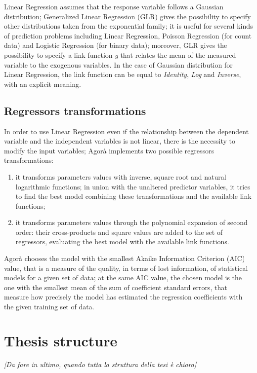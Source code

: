 Linear Regression assumes that the response variable follows a Gaussian distribution; Generalized Linear Regression (GLR) gives the possibility to specify other distributions taken from the exponential family; it is useful for several kinds of prediction problems including Linear Regression, Poisson Regression (for count data) and Logistic Regression (for binary data); moreover, GLR gives the possibility to specify a link function \textit{g} that relates the mean of the measured variable to the exogenous variables. In the case of Gaussian distribution for Linear Regression, the link function can be equal to \textit{Identity}, \textit{Log} and \textit{Inverse}, with an explicit meaning.


\subsection{Regressors transformations}\label{regrTransforms}

In order to use Linear Regression even if the relationship between the dependent variable and the independent variables is not linear, there is the necessity to modify the input variables; Agorà implements two possible regressors transformations:

\begin{enumerate}

    \item it transforms parameters values with inverse, square root and natural logarithmic functions; in union with the unaltered predictor variables, it tries to find the best model combining these transformations and the available link functions;
    
    \item it transforms parameters values through the polynomial expansion of second order: their cross-products and square values are added to the set of regressors, evaluating the best model with the available link functions.

\end{enumerate}

Agorà chooses the model with the smallest Akaike Information Criterion (AIC) value, that is a measure of the quality, in terms of lost information, of statistical models for a given set of data; at the same AIC value, the chosen model is the one with the smallest mean of the sum of coefficient standard errors, that measure how precisely the model has estimated the regression coefficients with the given training set of data.




\section{Thesis structure}

\textit{ [Da fare in ultimo, quando tutta la struttura della tesi è chiara] }
